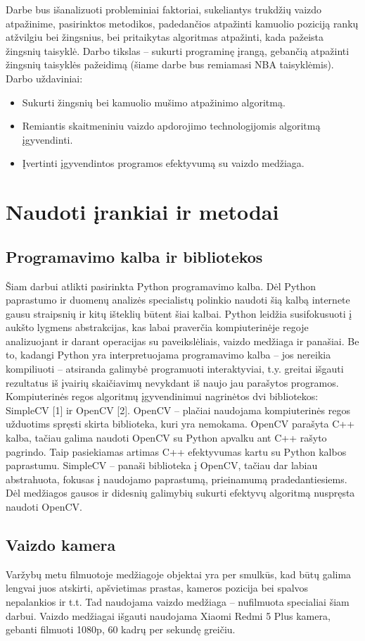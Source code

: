 \documentclass{VUMIFPSkursinis}
\begin{document}
Darbe bus išanalizuoti probleminiai faktoriai, sukeliantys trukdžių vaizdo atpažinime, pasirinktos metodikos, padedančios atpažinti kamuolio poziciją rankų atžvilgiu bei žingsnius, bei pritaikytas algoritmas atpažinti, kada pažeista žingsnių taisyklė. Darbo tikslas – sukurti programinę įrangą, gebančią atpažinti žingsnių taisyklės pažeidimą (šiame darbe bus remiamasi NBA taisyklėmis). Darbo uždaviniai:
\begin{itemize}
 \item Sukurti žingsnių bei kamuolio mušimo atpažinimo algoritmą.
 \item Remiantis skaitmeniniu vaizdo apdorojimo technologijomis algoritmą įgyvendinti.
 \item Įvertinti įgyvendintos programos efektyvumą su vaizdo medžiaga.
\end{itemize}

\section{Naudoti įrankiai ir metodai}
\subsection{Programavimo kalba ir bibliotekos}
Šiam darbui atlikti pasirinkta Python programavimo kalba. Dėl Python paprastumo ir duomenų analizės specialistų polinkio naudoti šią kalbą internete gausu straipsnių ir kitų išteklių būtent šiai kalbai. Python leidžia susifokusuoti į aukšto lygmens abstrakcijas, kas labai praverčia kompiuterinėje regoje analizuojant ir darant operacijas su paveikslėliais, vaizdo medžiaga ir panašiai. Be to, kadangi Python yra interpretuojama programavimo kalba – jos nereikia kompiliuoti – atsiranda galimybė programuoti interaktyviai, t.y. greitai išgauti rezultatus iš įvairių skaičiavimų nevykdant iš naujo jau parašytos programos. 
Kompiuterinės regos algoritmų įgyvendinimui nagrinėtos dvi bibliotekos: SimpleCV [1] ir OpenCV [2]. OpenCV – plačiai naudojama kompiuterinės regos užduotims spręsti skirta biblioteka, kuri yra nemokama. OpenCV parašyta C++ kalba, tačiau galima naudoti OpenCV su  Python apvalku ant C++ rašyto pagrindo. Taip pasiekiamas artimas C++ efektyvumas kartu su Python kalbos paprastumu.
SimpleCV – panaši biblioteka į OpenCV, tačiau dar labiau abstrahuota, fokusas į naudojamo paprastumą, prieinamumą pradedantiesiems. Dėl medžiagos gausos ir didesnių galimybių sukurti efektyvų algoritmą nuspręsta naudoti OpenCV.
\subsection{Vaizdo kamera}
Varžybų metu filmuotoje medžiagoje objektai yra per smulkūs, kad būtų galima lengvai juos atskirti, apšvietimas prastas, kameros pozicija bei spalvos nepalankios ir t.t. Tad naudojama vaizdo medžiaga – nufilmuota specialiai šiam darbui. Vaizdo medžiagai išgauti naudojama Xiaomi Redmi 5 Plus kamera, gebanti filmuoti 1080p, 60 kadrų per sekundę greičiu. 
\end{document}
